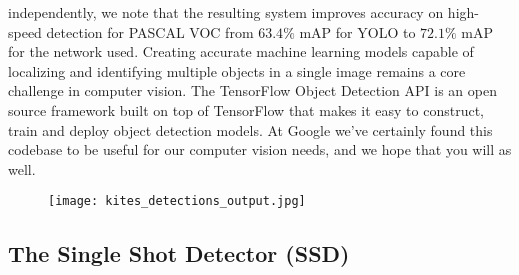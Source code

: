 independently, we note that the resulting system improves accuracy on high-speed
detection for PASCAL VOC from $63.4\%$ mAP for YOLO to $72.1\%$ mAP for the
network used.\cite{liu2016ssd,Huang2016SpeedAccuracyTF}
Creating accurate machine learning models capable of localizing and identifying
multiple objects in a single image remains a core challenge in computer vision.
The TensorFlow Object Detection API is an open source framework built on top of
TensorFlow that makes it easy to construct, train and deploy object detection
models. At Google we’ve certainly found this codebase to be useful for our
computer vision needs, and we hope that you will as well.\cite{objectdetectionAPI}
%
%
\begin{figure}[!h]
	\centering
	\texttt{[image: kites\_detections\_output.jpg]}
	\label{fig:kites-detections-output}
\end{figure}
%
%
\subsection{The Single Shot Detector (SSD)}
\label{ssec:single-shot-detector}

